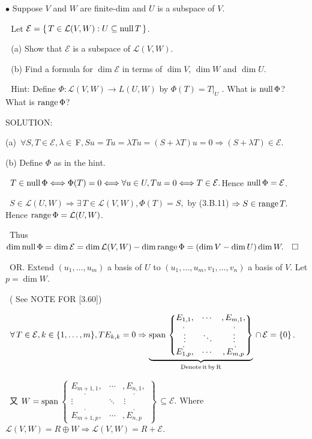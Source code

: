 \documentclass[a4paper, 11pt, UTF8]{article}
\def\range{\textup{range}\,}
\def\null{\textup{null\,}}
\def\Spn{\textup{span}\,}
\def\Lm{\mathcal{L}}
\def\Fbfc{$\,{\timesbf F}$}
\begin{document}
\begin{large}
{\small $\bullet$} {\timessl\Large 
Suppose $V$ and $W$ are finite-dim and $U$ is a subspace of $V$.}\par\,\,
{\timessl\Large Let $\mathcal{E} = \{\,T\in\Lm(V, W): U\subseteq\null T\,\}$.}\par\,\,
(a) {\timessl\Large Show that $\mathcal{E}$ is a subspace of $\Lm(V, W)$.}\par\,\,
(b) {\timessl\Large Find a formula for $\dim \mathcal{E}$ in terms of $\dim V$, $\dim W$ and $\dim U$.}\par\,\,
{\timessl\normalsize
Hint: Define $\Phi:\Lm(V, W)\rightarrow L(U, W)$ by $\Phi(T) = T|_U$ . What is $\null\Phi$?
What is $\range\Phi$?
}\par
{\timesbf S\footnotesize{OLUTION:}}\par\quad
(a) \,$\forall S,T\in\mathcal{E},\lambda\in\Fbfc,Su=Tu=\lambda Tu=(S+\lambda T)u=0\Rightarrow(S+\lambda T)\in\mathcal{E}.$\par\quad
(b) Define $\Phi$ as in the hint.\par\qquad\,
$T\in\null\Phi\Longleftrightarrow\Phi(T)=0\Longleftrightarrow\forall u\in U,Tu=0\Longleftrightarrow T\in\mathcal{E}.$\qquad\qquad\qquad Hence $\null\Phi=\mathcal{E}$.\par\qquad\,
$S\in\Lm(U,W)\Rightarrow\exists\,T\in\Lm(V,W),\Phi(T)=S,$ by (3.B.11) $\Rightarrow S\in\range T.\,$\quad Hence $\range\Phi=\Lm(U,W)$.\par\qquad\,
Thus $\dim\null\Phi=\dim\mathcal{E}=\dim\Lm(V,W)-\dim\range\Phi=(\dim V-\dim U)\dim W.\quad\square$%
\par\qquad\,
O{\small R}. Extend $(u_1,\dots,u_m)$ a basis of $U$ to $(u_1,\dots,u_m,v_1,\dots,v_n)$ a basis of $V$. Let $p=\dim W$.\par\qquad\,
( See N{\small OTE} F{\small OR} [3.60])\par\qquad\,
$\forall \,T\in\mathcal{E},k\in\{1,\dots,m\},TE_{k,k}=0\Rightarrow\underbrace{\Spn\begin{Bmatrix} \underset{,}{E_{1,1}}, & \cdots & ,\underset{,}{E_{m,1}},\\ \vdots & \ddots & \,\vdots\\ \overset{,}{E_{1,p}}, & \cdots & ,\overset{,}{E_{m,p}}\end{Bmatrix}}_{\textup{Denote\,it\,by\,R}}\,\cap\,\mathcal{E}=\{0\}$.\par\qquad\,
又 $W=\Spn${\footnotesize$\begin{Bmatrix} \underset{,}{E_{m+1,1}}, & \cdots & ,\underset{,}{E_{n,1}},\\ \vdots & \ddots & \,\vdots\\ \overset{,}{E_{m+1,p}}, & \cdots & ,\overset{,}{E_{n,p}}\end{Bmatrix}$}$\,\subseteq\mathcal{E}$. Where $\Lm(V,W)=R\oplus W\Rightarrow\Lm(V,W)=R+\mathcal{E}.$\par\qquad\,

\end{large}
\end{document}
